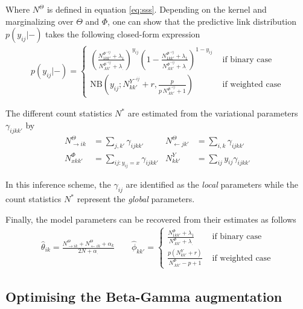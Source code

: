 Where $N^{\Theta}$ is defined in equation \eqref{eq:sss}.
Depending on the kernel and marginalizing over $\Theta$ and $\Phi$, one can show that the predictive link distribution $p(y_{ij}|-)$ takes the following closed-form expression
\begin{align*}
p(y_{ij} |-)=\begin{cases}
    \left( \frac{ N^{\Phi^{-ij}}_{1 kk'} + \lambda_1}{N^{\Phi^{-ij}}_{\bm{.}kk'} + \lambda_{\bm{.}}}\right)^{y_{ij}} \left( 1- \frac{ N^{\Phi^{-ij}}_{1 kk'} + \lambda_1}{N^{\Phi^{-ij}}_{\bm{.}kk'} + \lambda_{\bm{.}}}\right)^{1-y_{ij}}  & \textrm{ if binary case} \\
    \mathrm{NB}\left(y_{ij}; N^{Y^{-ij}}_{kk'} + r, \frac{p}{p\,N^{\Phi^{-ij}}_{\bm{.}kk'} + 1} \right) & \textrm{ if weighted case} 
\end{cases}
\end{align*}

The different count statistics $N^*$ are estimated from the variational parameters $\gamma_{ijkk'}$ by
\begin{align} \label{eq:sss}
    N^{\Theta}_{\rightarrow ik} &= \sum_{j, k'} \gamma_{ijkk'}        & N^{\Theta}_{\leftarrow jk'} &= \sum_{i, k} \gamma_{ijkk'}  \nonumber \\
    N^{\Phi}_{xkk'} &= \sum_{ij:y_{ij}=x} \gamma_{ijkk'}  & N^{Y}_{kk'} &= \sum_{ij} y_{ij}\gamma_{ijkk'}
\end{align}

In this inference scheme, the $\gamma_{ij}$ are identified as the \emph{local} parameters while the count statistics $N^*$ represent the \emph{global} parameters.  

Finally, the model parameters can be recovered from their estimates as follows
\begin{align*}
\hat \theta_{ik} = \frac{N^{\Theta}_{\rightarrow ik} + N^{\Theta}_{\leftarrow ik} + \alpha_k}{2N + \alpha_{\bm{.}}} \qquad 
\hat \phi_{kk'}=\begin{cases}
     \frac{N^{\Phi}_{1 kk'} + \lambda_1}{N^{\Phi}_{\bm{.}kk'} + \lambda_{\bm{.}}} & \textrm{ if binary case} \\
    \frac{p(N^Y_{kk'} + r)}{N^{\Phi}_{\bm{.}kk'} - p + 1}  & \textrm{ if weighted case} 
    \end{cases}
\end{align*}


\subsection{Optimising the Beta-Gamma augmentation}

